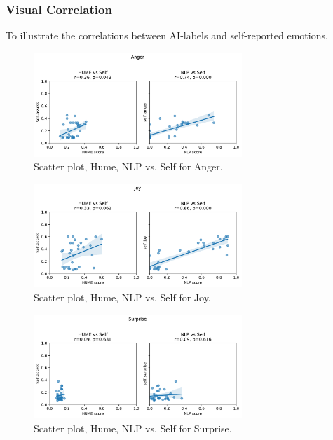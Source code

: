 \subsubsection{Visual Correlation}
To illustrate the correlations between AI-labels and self-reported emotions, 
\begin{figure}[!h]
    \centering
    \includegraphics[width=0.7\textwidth]{png/results/rq3/scatter_anger_vs_self.pdf}
    \caption{Scatter plot, Hume, NLP vs. Self for Anger.}
    \label{fig:scatter-anger-rq3}
\end{figure}

\begin{figure}[!h]
    \centering
    \includegraphics[width=0.7\textwidth]{png/results/rq3/scatter_joy_vs_self.pdf}
    \caption{Scatter plot, Hume, NLP vs. Self for Joy.}
    \label{fig:scatter-joy-rq3}
\end{figure}

\begin{figure}[!h]
    \centering
    \includegraphics[width=0.7\textwidth]{png/results/rq3/scatter_surprise_vs_self.pdf}
    \caption{Scatter plot, Hume, NLP vs. Self for Surprise.}
    \label{fig:scatter-surprise-rq3}
\end{figure}

